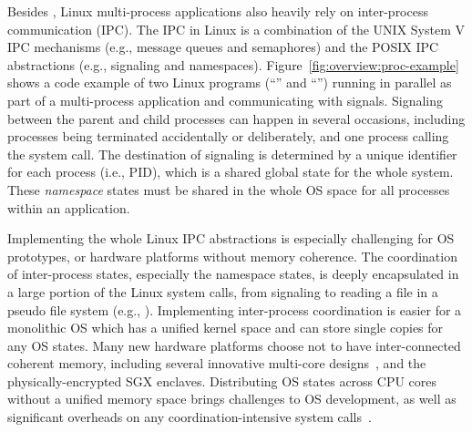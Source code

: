 Besides ,
Linux multi-process applications also heavily rely on
inter-process communication (IPC).
The IPC
in Linux is a combination of the UNIX System V IPC mechanisms (e.g., message queues and semaphores)
and the POSIX IPC abstractions (e.g., signaling and namespaces).
Figure~\ref{fig:overview:proc-example} shows a code example of
two Linux programs (``'' and ``'')
running in parallel as part of a multi-process application and communicating with signals.
Signaling between the parent and child processes
can happen in several occasions, including processes being terminated accidentally or deliberately, and one process calling the  system call.
The destination of signaling is determined by a unique identifier
for each process (i.e., PID),
which is a shared global state for the whole system.
These {\em namespace} states must be shared in the whole OS space
for all processes within an application.


Implementing the whole Linux IPC abstractions is especially challenging for
OS prototypes, or hardware platforms without
memory coherence.
The coordination of inter-process states, especially the namespace states, is deeply encapsulated in a large portion of the Linux system calls,
from signaling to reading a file in a pseudo file system (e.g., ).
Implementing inter-process coordination is easier
for a monolithic OS which has a unified kernel space and can store single copies for any OS states. 
Many new hardware platforms choose not to have inter-connected coherent memory,
including several innovative multi-core designs~\cite{gschwind2007,cascaval2002evaluation},
and the physically-encrypted SGX enclaves.
Distributing OS states across CPU cores without a unified memory space
brings challenges to OS development,
as well as significant overheads on any coordination-intensive
system calls~\cite{baumann09barrelfish}.






